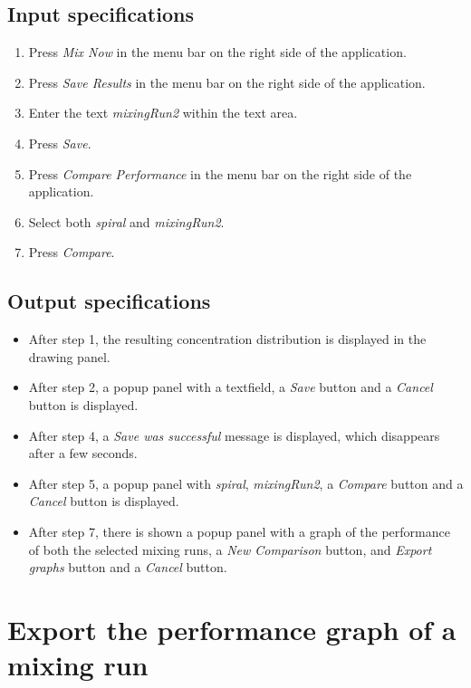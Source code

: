 \subsection*{Input specifications}
\begin{enumerate}
\item Press \emph{Mix Now} in the menu bar on the right side of the application.
\item Press \emph{Save Results} in the menu bar on the right side of the application.
\item Enter the text \emph{mixingRun2} within the text area.
\item Press \emph{Save}.
\item Press \emph{Compare Performance} in the menu bar on the right side of the application.
\item Select both \emph{spiral} and \emph{mixingRun2}.
\item Press \emph{Compare}.
\end{enumerate}

\subsection*{Output specifications}
\begin{itemize}
\item After step 1, the resulting concentration distribution is displayed in the drawing panel.
\item After step 2, a popup panel with a textfield, a \emph{Save} button and a \emph{Cancel} button is displayed.
\item After step 4, a \emph{Save was successful} message is displayed, which disappears after a few seconds.
\item After step 5, a popup panel with \emph{spiral}, \emph{mixingRun2}, a \emph{Compare} button and a \emph{Cancel} button is displayed.
\item After step 7, there is shown a popup panel with a graph of the performance of both the selected mixing runs, a \emph{New Comparison} button, and \emph{Export graphs} button and a \emph{Cancel} button.
\end{itemize}

\section{Export the performance graph of a mixing run}

